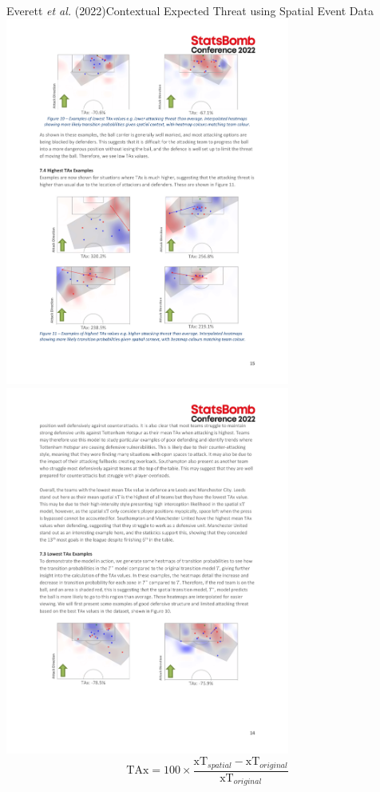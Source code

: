 \documentclass{beamer}
\begin{document}
  \begin{frame}{Everett {\it et al.} (2022)}{Contextual Expected Threat using Spatial Event Data}
    \centering
    \includegraphics[width = 0.7\textwidth]{images/everett_etall_2022_hi.pdf}\\
    \includegraphics[width = 0.7\textwidth]{images/everett_etall_2022_lo.pdf}
    $$\mbox{TAx} = 100 \times \frac{\mbox{xT}_{spatial} - \mbox{xT}_{original}}{\mbox{xT}_{original}}$$
  \end{frame}
\end{document}
